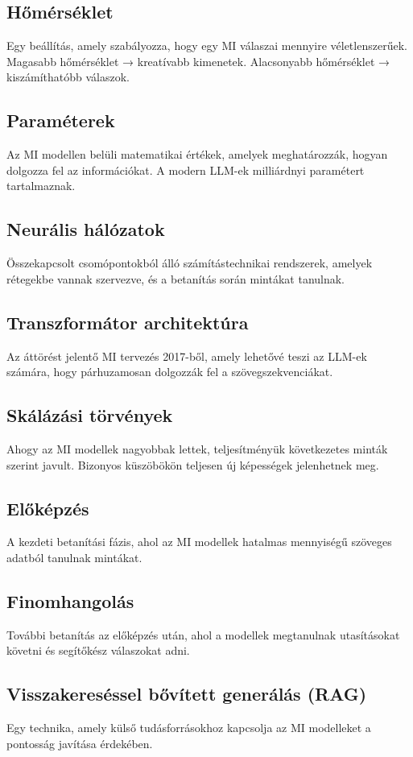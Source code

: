 \documentclass[a4paper, 11pt]{article}
\begin{document}
\begin{multicols}{2}
\subsection{Hőmérséklet}
Egy beállítás, amely szabályozza, hogy egy MI válaszai mennyire véletlenszerűek. Magasabb hőmérséklet → kreatívabb kimenetek. Alacsonyabb hőmérséklet → kiszámíthatóbb válaszok.

\subsection{Paraméterek}
Az MI modellen belüli matematikai értékek, amelyek meghatározzák, hogyan dolgozza fel az információkat. A modern LLM-ek milliárdnyi paramétert tartalmaznak.

\subsection{Neurális hálózatok}
Összekapcsolt csomópontokból álló számítástechnikai rendszerek, amelyek rétegekbe vannak szervezve, és a betanítás során mintákat tanulnak.

\subsection{Transzformátor architektúra}
Az áttörést jelentő MI tervezés 2017-ből, amely lehetővé teszi az LLM-ek számára, hogy párhuzamosan dolgozzák fel a szövegszekvenciákat.

\subsection{Skálázási törvények}
Ahogy az MI modellek nagyobbak lettek, teljesítményük következetes minták szerint javult. Bizonyos küszöbökön teljesen új képességek jelenhetnek meg.

\subsection{Előképzés}
A kezdeti betanítási fázis, ahol az MI modellek hatalmas mennyiségű szöveges adatból tanulnak mintákat.

\subsection{Finomhangolás}
További betanítás az előképzés után, ahol a modellek megtanulnak utasításokat követni és segítőkész válaszokat adni.

\subsection{Visszakereséssel bővített generálás (RAG)}
Egy technika, amely külső tudásforrásokhoz kapcsolja az MI modelleket a pontosság javítása érdekében.


\end{multicols}
\end{document}
